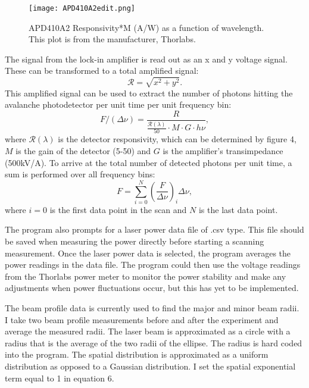 \documentclass[12pt, a4paper]{article}
\begin{document}
\begin{figure}
  \vspace*{-8mm}
  \texttt{[image: APD410A2edit.png]}
  \vspace*{-6mm}
  \caption{APD410A2 Responsivity*M (A/W) as a function of wavelength. This plot is from the manufacturer, Thorlabs.}
\end{figure}


The signal from the lock-in amplifier is read out as an x and y voltage signal. These can be transformed to a total amplified signal:
\begin{equation}
\mathscr{R} = \sqrt{x^2+y^2}.
\end{equation}
This amplified signal can be used to extract the number of photons hitting the avalanche photodetector per unit time per unit frequency bin:
\begin{equation}
F/(\Delta \nu) = \frac{R}{\frac{\mathcal{R}(\lambda)}{50}\cdot M\cdot G \cdot h\nu},
\end{equation}
where $\mathcal{R}(\lambda)$ is the detector responsivity, which can be determined by figure 4, $M$ is the gain of the detector (5-50) and $G$ is the amplifier's transimpedance (500kV/A). To arrive at the total number of detected photons per unit time, a sum is performed over all frequency bins:
\begin{equation}
F = \sum_{i=0}^{N}(\frac{F}{\Delta \nu})_i \Delta \nu,
\end{equation}
where $i=0$ is the first data point in the scan and $N$ is the last data point.

The program also prompts for a laser power data file of .csv type. This file should be saved when measuring the power directly before starting a scanning measurement. Once the laser power data is selected, the program averages the power readings in the data file. The program could then use the voltage readings from the Thorlabs power meter to monitor the power stability and make any adjustments when power fluctuations occur, but this has yet to be implemented. 

The beam profile data is currently used to find the major and minor beam radii. I take two beam profile measurements before and after the experiment and average the measured radii.  The laser beam is approximated as a circle with a radius that is the average of the two radii of the ellipse. The radius is hard coded into the program. The spatial distribution is approximated as a uniform distribution as opposed to a Gaussian distribution. I set the spatial exponential term equal to 1 in equation 6. 
\end{document}
